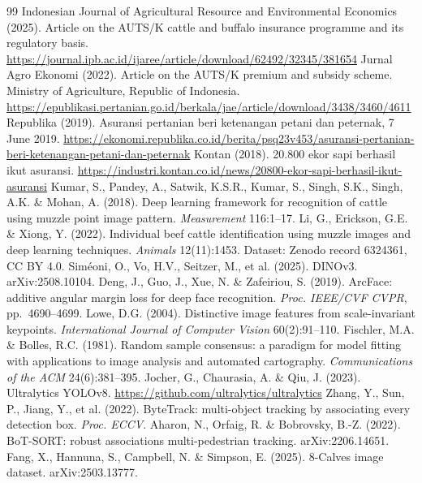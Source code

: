 \documentclass[11pt,letterpaper]{article}
\begin{document}
\begin{thebibliography}{99}
\small
{} Indonesian Journal of Agricultural Resource and Environmental Economics (2025). Article on the AUTS/K cattle and buffalo insurance programme and its regulatory basis. \url{https://journal.ipb.ac.id/ijaree/article/download/62492/32345/381654}
 Jurnal Agro Ekonomi (2022). Article on the AUTS/K premium and subsidy scheme. Ministry of Agriculture, Republic of Indonesia. \url{https://epublikasi.pertanian.go.id/berkala/jae/article/download/3438/3460/4611}
 Republika (2019). Asuransi pertanian beri ketenangan petani dan peternak, 7 June 2019. \url{https://ekonomi.republika.co.id/berita/psq23v453/asuransi-pertanian-beri-ketenangan-petani-dan-peternak}
 Kontan (2018). 20.800 ekor sapi berhasil ikut asuransi. \url{https://industri.kontan.co.id/news/20800-ekor-sapi-berhasil-ikut-asuransi}
 Kumar, S., Pandey, A., Satwik, K.S.R., Kumar, S., Singh, S.K., Singh, A.K. \& Mohan, A. (2018). Deep learning framework for recognition of cattle using muzzle point image pattern. \emph{Measurement} 116:1--17.
 Li, G., Erickson, G.E. \& Xiong, Y. (2022). Individual beef cattle identification using muzzle images and deep learning techniques. \emph{Animals} 12(11):1453. Dataset: Zenodo record 6324361, CC BY 4.0.
 Sim\'eoni, O., Vo, H.V., Seitzer, M., et al. (2025). DINOv3. arXiv:2508.10104.
 Deng, J., Guo, J., Xue, N. \& Zafeiriou, S. (2019). ArcFace: additive angular margin loss for deep face recognition. \emph{Proc. IEEE/CVF CVPR}, pp.~4690--4699.
 Lowe, D.G. (2004). Distinctive image features from scale-invariant keypoints. \emph{International Journal of Computer Vision} 60(2):91--110.
 Fischler, M.A. \& Bolles, R.C. (1981). Random sample consensus: a paradigm for model fitting with applications to image analysis and automated cartography. \emph{Communications of the ACM} 24(6):381--395.
 Jocher, G., Chaurasia, A. \& Qiu, J. (2023). Ultralytics YOLOv8. \url{https://github.com/ultralytics/ultralytics}
 Zhang, Y., Sun, P., Jiang, Y., et al. (2022). ByteTrack: multi-object tracking by associating every detection box. \emph{Proc. ECCV}.
 Aharon, N., Orfaig, R. \& Bobrovsky, B.-Z. (2022). BoT-SORT: robust associations multi-pedestrian tracking. arXiv:2206.14651.
 Fang, X., Hannuna, S., Campbell, N. \& Simpson, E. (2025). 8-Calves image dataset. arXiv:2503.13777.

\end{thebibliography}
\end{document}
